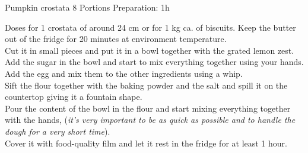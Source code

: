 \documentclass{book}
\begin{document}
    \begin{recipe}{Pumpkin crostata} {8 Portions} {Preparation: 1h}

        \freeform Doses for 1 crostata of around 24 cm or for 1 kg ca. of biscuits.
        Keep the butter out of the fridge for 20 minutes at environment temperature.\\
        Cut it in small pieces and put it in a bowl together with the grated lemon zest.\\
        Add the sugar in the bowl and start to mix everything together using your hands.\\
        Add the egg and mix them to the other ingredients using a whip.\\
        Sift the flour together with the baking powder and the salt and spill it on the countertop giving it a fountain shape.\\
        Pour the content of the bowl in the flour and start mixing everything together with the hands,
        (\textit{it's very important to be as quick as possible and to handle the dough for a very short time}).\\
        Cover it with food-quality film and let it rest in the fridge for at least 1 hour.


    \end{recipe}
\end{document}
